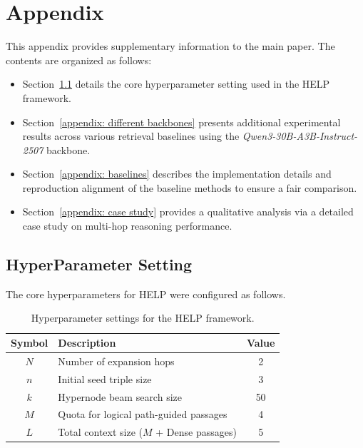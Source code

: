 \newpage
\appendix
\onecolumn
\section{Appendix}

This appendix provides supplementary information to the main paper. The contents are organized as follows:
\begin{itemize}[nosep]
    \item Section~\ref{appendix: hyperparameter setting} details the core hyperparameter setting used in the HELP framework.
    \item Section~\ref{appendix: different backbones} presents additional experimental results across various retrieval baselines using the \textit{Qwen3-30B-A3B-Instruct-2507} backbone.
    \item Section~\ref{appendix: baselines} describes the implementation details and reproduction alignment of the baseline methods to ensure a fair comparison.    \item Section~\ref{appendix: case study} provides a qualitative analysis via a detailed case study on multi-hop reasoning performance.
\end{itemize}

\subsection{HyperParameter Setting}\label{appendix: hyperparameter setting}
The core hyperparameters for HELP were configured as follows.
\begin{table}[h]
    \centering
    \caption{Hyperparameter settings for the HELP framework.}
    \label{tab:hyperparameters}
    \small
    \renewcommand{\arraystretch}{1.2}
    \begin{tabular}{clc}
        \toprule
        \textbf{Symbol} & \textbf{Description} & \textbf{Value} \\
        \midrule
        $N$ & Number of expansion hops & 2 \\
        $n$ & Initial seed triple size & 3 \\
        $k$ & Hypernode beam search size & 50 \\
        $M$ & Quota for logical path-guided passages & 4 \\
        $L$ & Total context size ($M$ + Dense passages) & 5 \\
        \bottomrule
    \end{tabular}
\end{table}

